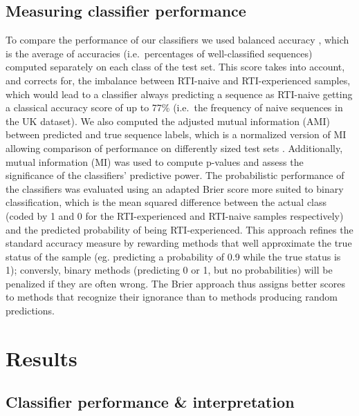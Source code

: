\documentclass[
  11pt,
  twoside]{scrbook}
\begin{document}
\hypertarget{measuring-classifier-performance}{%
\subsection{Measuring classifier performance}\label{measuring-classifier-performance}}

To compare the performance of our classifiers we used balanced accuracy
\autocite{brodersenBalancedAccuracyIts2010}, which is the average of accuracies
(i.e.~percentages of well-classified sequences) computed separately on
each class of the test set. This score takes into account, and corrects
for, the imbalance between RTI-naive and RTI-experienced samples, which
would lead to a classifier always predicting a sequence as RTI-naive
getting a classical accuracy score of up to 77\% (i.e.~the frequency of
naive sequences in the UK dataset). We also computed the adjusted mutual
information (AMI) between predicted and true sequence labels, which is a
normalized version of MI allowing comparison of performance on
differently sized test sets \autocite{vinhInformationTheoreticMeasures2010}.
Additionally, mutual information (MI) was used to compute p-values and
assess the significance of the classifiers' predictive power. The
probabilistic performance of the classifiers was evaluated using an
adapted Brier score \autocite{brierVERIFICATIONFORECASTSEXPRESSED1950} more
suited to binary classification, which is the mean squared difference
between the actual class (coded by 1 and 0 for the RTI-experienced and
RTI-naive samples respectively) and the predicted probability of being
RTI-experienced. This approach refines the standard accuracy measure by
rewarding methods that well approximate the true status of the sample
(eg. predicting a probability of 0.9 while the true status is 1);
conversly, binary methods (predicting 0 or 1, but no probabilities) will
be penalized if they are often wrong. The Brier approach thus assigns
better scores to methods that recognize their ignorance than to methods
producing random predictions.

\hypertarget{hiv-results}{%
\section{Results}\label{hiv-results}}

\hypertarget{classifier-performance-interpretation}{%
\subsection{Classifier performance \& interpretation}\label{classifier-performance-interpretation}}
\end{document}
